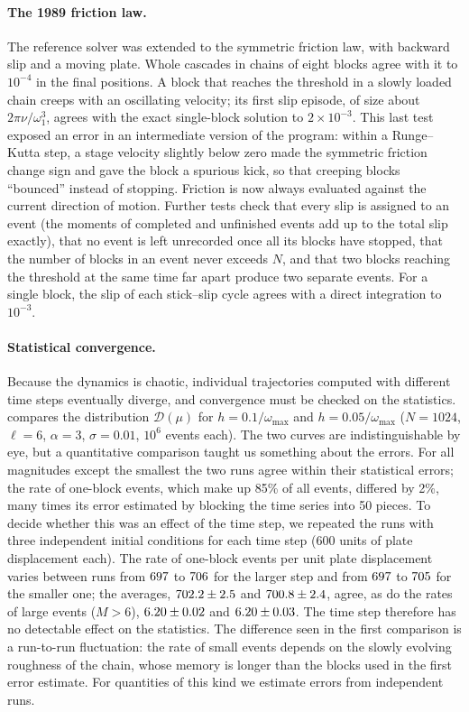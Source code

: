 \paragraph{The 1989 friction law.} The reference solver was extended to the symmetric friction law, with backward slip and a moving plate. Whole cascades in
chains of eight blocks agree with it to $10^{-4}$ in the final positions. A block that reaches the threshold in a slowly loaded chain creeps with an
oscillating velocity; its first slip episode, of size about $2\pi\nu/\omega_1^3$, agrees with the exact single-block solution to $2\times10^{-3}$. This last
test exposed an error in an intermediate version of the program: within a Runge--Kutta step, a stage velocity slightly below zero made the symmetric friction
change sign and gave the block a spurious kick, so that creeping blocks ``bounced'' instead of stopping. Friction is now always evaluated against the current
direction of motion. Further tests check that every slip is assigned to an event (the moments of completed and unfinished events add up to the total slip
exactly), that no event is left unrecorded once all its blocks have stopped, that the number of blocks in an event never exceeds $N$, and that two blocks
reaching the threshold at the same time far apart produce two separate events. For a single block, the slip of each stick--slip cycle agrees with a direct
integration to $10^{-3}$.

\paragraph{Statistical convergence.} Because the dynamics is chaotic, individual trajectories computed with different time steps eventually diverge, and convergence must
be checked on the statistics.  compares the distribution $\mathcal D(\mu)$ for $h = 0.1/\omega_{\max}$ and $h=0.05/\omega_{\max}$ ($N=1024$, $\ell=6$,
$\alpha=3$, $\sigma=0.01$, $10^6$ events each). The two curves are indistinguishable by eye, but a quantitative comparison taught us something about the errors. For all
magnitudes except the smallest the two runs agree within their statistical errors; the rate of one-block events, which make up 85\% of all events, differed by 2\%, many
times its error estimated by blocking the time series into 50 pieces. To decide whether this was an effect of the time step, we repeated the runs with three independent
initial conditions for each time step (600 units of plate displacement each). The rate of one-block events per unit plate displacement varies between runs from
$697$ to $706$ for the larger step and from $697$ to $705$ for the smaller one; the averages, $702.2\pm2.5$
and $700.8\pm2.4$, agree, as do the rates of large events ($M>6$), $6.20\pm0.02$ and $6.20\pm0.03$. The time step
therefore has no detectable effect on the statistics. The difference seen in the first comparison is a run-to-run fluctuation: the rate of small events depends on the
slowly evolving roughness of the chain, whose memory is longer than the blocks used in the first error estimate. For quantities of this kind we estimate errors from
independent runs.

